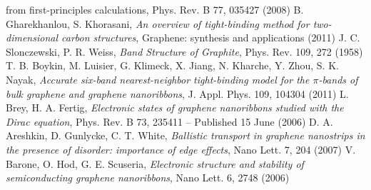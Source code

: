 \begin{thebibliography}{99}
{from first-principles calculations}, Phys. Rev. B 77, 035427 (2008)
 B. Gharekhanlou, S. Khorasani, \textit{An overview of tight-binding method for two-dimensional carbon structures}, Graphene: synthesis and applications (2011)
 J. C. Slonczewski, P. R. Weiss, \textit{Band Structure of Graphite}, Phys. Rev. 109, 272 (1958)
 T. B. Boykin, M. Luisier, G. Klimeck, X. Jiang, N. Kharche, Y. Zhou, S. K. Nayak, \textit{Accurate six-band nearest-neighbor tight-binding model for the $\pi$-bands of bulk graphene and graphene nanoribbons}, J. Appl. Phys. 109, 104304 (2011)
 L. Brey, H. A. Fertig, \textit{Electronic states of graphene nanoribbons studied with the Dirac equation}, Phys. Rev. B 73, 235411 – Published 15 June (2006)
 D. A. Areshkin, D. Gunlycke, C. T. White, \textit{Ballistic transport in graphene nanostrips in the presence of disorder: importance of edge effects}, Nano Lett. 7, 204 (2007)
 V. Barone, O. Hod, G. E. Scuseria, \textit{Electronic structure and stability of semiconducting graphene nanoribbons}, Nano Lett. 6, 2748 (2006)
\end{thebibliography}
